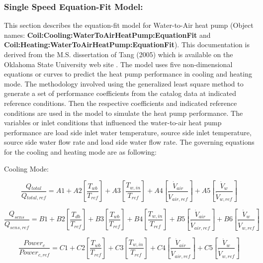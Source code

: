 \subsubsection{Single Speed Equation-Fit Model:}\label{single-speed-equation-fit-model}

This section describes the equation-fit model for Water-to-Air heat pump (Object names: \textbf{Coil:Cooling:WaterToAirHeatPump:EquationFit} and \\ \textbf{Coil:Heating:WaterToAirHeatPump:EquationFit}). This documentation is derived from the M.S. dissertation of Tang (2005) which is available on the Oklahoma State University web site . The model uses five non-dimensional equations or curves to predict the heat pump performance in cooling and heating mode. The methodology involved using the generalized least square method to generate a set of performance coefficients from the catalog data at indicated reference conditions. Then the respective coefficients and indicated reference conditions are used in the model to simulate the heat pump performance. The variables or inlet conditions that influenced the water-to-air heat pump performance are load side inlet water temperature, source side inlet temperature, source side water flow rate and load side water flow rate. The governing equations for the cooling and heating mode are as following:

Cooling Mode:

\begin{equation}
\frac{{Q{}_{total}}}{{Q{}_{total,ref}}} = A1 + A2\left[ {\frac{{{T_{wb}}}}{{{T_{ref}}}}} \right] + A3\left[ {\frac{{T{}_{w,in}}}{{T{}_{ref}}}} \right] + A4\left[ {\frac{{{{\dot V}_{air}}}}{{{{\dot V}_{air,ref}}}}} \right] + A5\left[ {\frac{{{{\dot V}_w}}}{{{{\dot V}_{w,ref}}}}} \right]
\end{equation}

\begin{equation}
\frac{{{Q_{sens}}}}{{{Q_{sens,ref}}}} = B1 + B2\left[ {\frac{{T{}_{db}}}{{T{}_{ref}}}} \right] + B3\left[ {\frac{{T{}_{wb}}}{{T{}_{ref}}}} \right] + B4\left[ {\frac{{T{}_{w,in}}}{{T{}_{ref}}}} \right] + B5\left[ {\frac{{{{\dot V}_{air}}}}{{{{\dot V}_{air,ref}}}}} \right] + B6\left[ {\frac{{\dot V{}_w}}{{\dot V{}_{w,ref}}}} \right]
\end{equation}

\begin{equation}
\frac{{Power{}_c}}{{Power{}_{c,ref}}} = C1 + C2\left[ {\frac{{{T_{wb}}}}{{{T_{ref}}}}} \right] + C3\left[ {\frac{{T{}_{w,in}}}{{T{}_{ref}}}} \right] + C4\left[ {\frac{{{{\dot V}_{air}}}}{{{{\dot V}_{air,ref}}}}} \right] + C5\left[ {\frac{{{{\dot V}_w}}}{{{{\dot V}_{w,ref}}}}} \right]
\end{equation}

